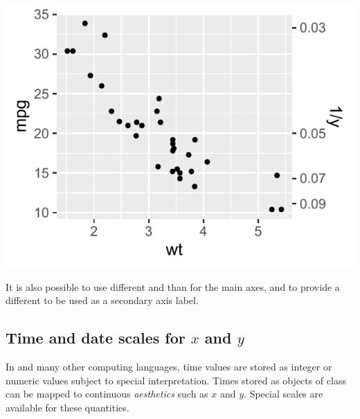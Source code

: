 \documentclass[krantz2]{krantz}\usepackage{knitr}
\begin{document}
\begin{knitrout}\footnotesize
{}\color{fgcolor}\begin{kframe}
\begin{alltt}
\hlstd{(}   \hlopt{+}
  \hlstd{()} \hlopt{+}
  \hlstd{(} \hlstd{=} \hlstd{(}\hlopt{~}  \hlopt{^-}\hlstd{,}  \hlstd{=} \hlstd{) )}
\end{alltt}
\end{kframe}

{\centering \includegraphics[width=.54\textwidth]{figure/pos-axis-secondary-01-1} 

}



\end{knitrout}

It is also possible to use different  and  than for the main axes, and to provide a different  to be used as a secondary axis label.

\begin{knitrout}\footnotesize
{}\color{fgcolor}\begin{kframe}
\begin{alltt}
  \hlstd{(} \hlstd{=} \hlstd{(}\hlopt{~}   \hlstd{=} \hlstd{,}  \hlstd{=} \hlstd{()))}
\end{alltt}
\end{kframe}
\end{knitrout}

\subsection{Time and date scales for $x$ and $y$}\label{sec:plot:scales:time:date}
In \Rlang and many other computing languages, time values are stored as integer or numeric values subject to special interpretation. Times stored as objects of class  can be mapped to continuous \emph{aesthetics} such as $x$ and $y$. Special scales are available for these quantities.
\end{document}
